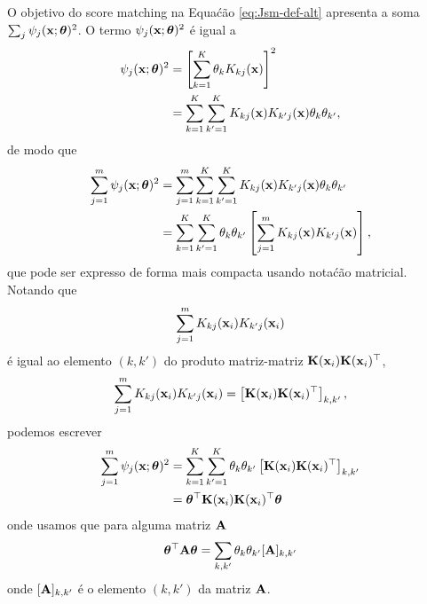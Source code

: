 \begin{exenumerate}
\begin{solution}
        O objetivo do score matching na Equa\'c\~ao \eqref{eq:Jsm-def-alt} apresenta a soma $\sum_j \psi_j(\mathbf{x};\boldsymbol{\theta})^2$. O termo $\psi_j(\mathbf{x};\boldsymbol{\theta})^2$ \'e igual a
        \begin{align}
            \psi_j(\mathbf{x}; \boldsymbol{\theta})^2 & = \left[ \sum_{k=1}^K \theta_k K_{kj}(\mathbf{x})\right]^2\\
            & =  \sum_{k=1}^K \sum_{k'=1}^K  K_{kj}(\mathbf{x}) K_{k'j}(\mathbf{x}) \theta_{k} \theta_{k'},
        \end{align}
        de modo que
        \begin{align}
            \sum_{j=1}^m \psi_j(\mathbf{x}; \boldsymbol{\theta})^2  &= \sum_{j=1}^m  \sum_{k=1}^K \sum_{k'=1}^K  K_{kj}(\mathbf{x}) K_{k'j}(\mathbf{x}) \theta_{k} \theta_{k'}\\
            & = \sum_{k=1}^K \sum_{k'=1}^K \theta_{k} \theta_{k'} \left[ \sum_{j=1}^m K_{kj}(\mathbf{x}) K_{k'j}(\mathbf{x}) \right],
        \end{align}
        que pode ser expresso de forma mais compacta usando nota\'c\~ao matricial. Notando
        que $$\sum_{j=1}^m K_{kj}(\mathbf{x}_i) K_{k'j}(\mathbf{x}_i)$$ \'e igual ao
        elemento $(k,k')$ do produto matriz-matriz $\mathbf{K}(\mathbf{x}_i)\mathbf{K}(\mathbf{x}_i)^\top$,
        \begin{equation}
            \sum_{j=1}^m K_{kj}(\mathbf{x}_i) K_{k'j}(\mathbf{x}_i) = \left[\mathbf{K}(\mathbf{x}_i)\mathbf{K}(\mathbf{x}_i)^\top\right]_{k,k'},
        \end{equation}
        podemos escrever
        \begin{align}
            \sum_{j=1}^m \psi_j(\mathbf{x}; \boldsymbol{\theta})^2 & =  \sum_{k=1}^K \sum_{k'=1}^K \theta_{k} \theta_{k'}  \left[\mathbf{K}(\mathbf{x}_i)\mathbf{K}(\mathbf{x}_i)^\top\right]_{k,k'}\\
            & =  \boldsymbol{\theta}^\top \mathbf{K}(\mathbf{x}_i)\mathbf{K}(\mathbf{x}_i)^\top \boldsymbol{\theta}
        \end{align}
        onde usamos que para alguma matriz $\mathbf{A}$
        \begin{equation}
            \boldsymbol{\theta}^\top \mathbf{A} \boldsymbol{\theta} = \sum_{k,k'} \theta_k \theta_{k'} [\mathbf{A}]_{k,k'}
        \end{equation}
        onde $[\mathbf{A}]_{k,k'}$ \'e o elemento $(k,k')$ da matriz $\mathbf{A}$.
        

\end{solution}
\end{exenumerate}
